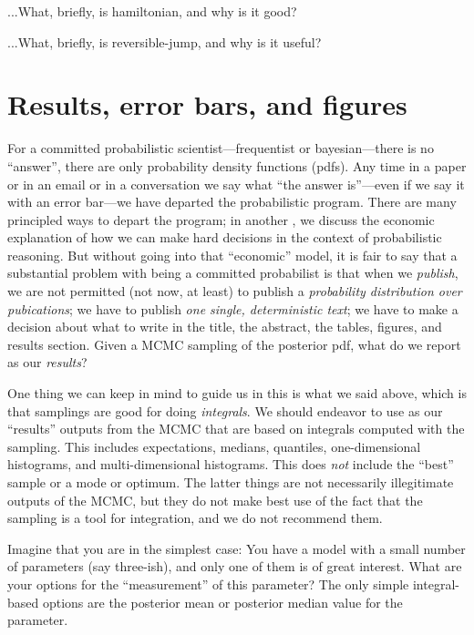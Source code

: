 \documentclass[12pt,twoside,pdftex]{article}
\begin{document}
...What, briefly, is hamiltonian, and why is it good?

...What, briefly, is reversible-jump, and why is it useful?

\section{Results, error bars, and figures}

For a committed probabilistic scientist---frequentist or
bayesian---there is no ``answer'', there are only probability density
functions (pdfs).  Any time in a paper or in an email or in a conversation
we say what ``the answer is''---even if we say it with an error
bar---we have departed the probabilistic program.  There are many
principled ways to depart the program; in another \documentname, we
discuss the economic explanation of how we can make hard decisions in
the context of probabilistic reasoning.
But without going into that ``economic'' model, it is fair to say that a
substantial problem with being a committed probabilist is that when we
\emph{publish}, we are not permitted (not now, at least) to publish a
\emph{probability distribution over pubications}; we have to publish
\emph{one single, deterministic text}; we have to make a decision about what
to write in the title, the abstract, the tables, figures, and results
section.  Given a MCMC sampling of the posterior pdf, what do we
report as our \emph{results}?

One thing we can keep in mind to guide us in this is what we said above,
  which is that samplings are good for doing \emph{integrals}.
We should endeavor to use as our ``results'' outputs from the MCMC
  that are based on integrals computed with the sampling.
This includes expectations, medians, quantiles, one-dimensional histograms,
  and multi-dimensional histograms.
This does \emph{not} include the ``best'' sample or a mode or optimum.
The latter things are not necessarily illegitimate outputs of the MCMC,
  but they do not make best use of the fact that the sampling is a tool for integration,
  and we do not recommend them.

Imagine that you are in the simplest case:
You have a model with a small number of parameters (say three-ish),
  and only one of them is of great interest.
What are your options for the ``measurement'' of this parameter?
The only simple integral-based options are the posterior mean
  or posterior median value for the parameter.
\end{document}
